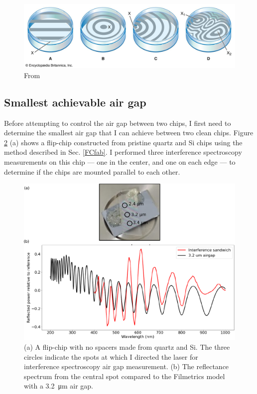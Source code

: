 \documentclass[double,12pt,1in]{beavtex}
\begin{document}
\begin{figure}
    \includegraphics[width=1\textwidth]{newtonsrings.png}
    \caption{From \cite{noauthor_newtons_nodate}}
    \label{newtonsrings}
\end{figure}



\subsection{Smallest achievable air gap} \label{smallest achievable air gap}
Before attempting to control the air gap between two chips, I first need to determine the smallest air gap that I can achieve between two clean chips. Figure \ref{interference sandwich} (a) shows a flip-chip constructed from pristine quartz and Si chips using the method described in Sec. \ref{FCfab}. I performed three interference spectroscopy measurements on this chip — one in the center, and one on each edge — to determine if the chips are mounted parallel to each other.


\begin{figure}
    \includegraphics[width=1\textwidth]{interference sandwich image and spectrum.pdf}
    \caption{(a) A flip-chip with no spacers made from quartz and Si. The three circles indicate the spots at which I directed the laser for interference spectroscopy air gap measurement. (b) The reflectance spectrum from the central spot compared to the Filmetrics model with a \SI{3.2}{\micro\meter} air gap.}
    \label{interference sandwich}
\end{figure}
\end{document}
